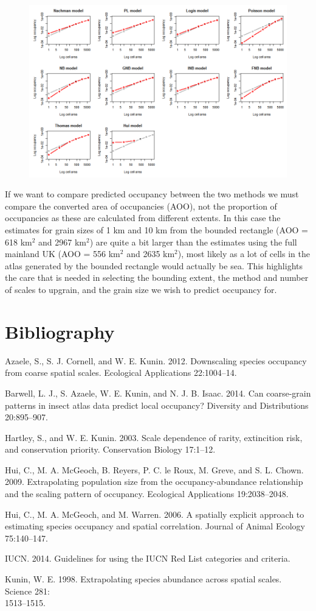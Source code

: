 \documentclass{article}[12pt, a4paper]
\begin{document}
\begin{figure}[!ht]
\centering
\includegraphics[width=\linewidth]{Downscaling-downscale42}
\end{figure}

If we want to compare predicted occupancy between the two methods we must compare the converted area of occupancies (AOO), not the proportion of occupancies as these are calculated from different extents. In this case the estimates for grain sizes of 1 km and 10 km from the bounded rectangle (AOO = 618 km$^2$ and 2967 km$^2$) are quite a bit larger than the estimates using the full mainland UK (AOO = 556 km$^2$ and 2635 km$^2$), most likely as a lot of cells in the atlas generated by the bounded rectangle would actually be sea. This highlights the care that is needed in selecting the bounding extent, the method and number of scales to upgrain, and the grain size we wish to predict occupancy for.

\section{Bibliography}

Azaele, S., S. J. Cornell, and W. E. Kunin. 2012. Downscaling species occupancy from coarse spatial scales. Ecological Applications 22:1004–14.

Barwell, L. J., S. Azaele, W. E. Kunin, and N. J. B. Isaac. 2014. Can coarse-grain patterns in insect atlas data predict local occupancy? Diversity and Distributions 20:895–907.

Hartley, S., and W. E. Kunin. 2003. Scale dependence of rarity, extincition risk, and conservation priority. Conservation Biology 17:1–12.

Hui, C., M. A. McGeoch, B. Reyers, P. C. le Roux, M. Greve, and S. L. Chown. 2009. Extrapolating population size from the occupancy-abundance relationship and the scaling pattern of occupancy. Ecological Applications 19:2038–2048.

Hui, C., M. A. McGeoch, and M. Warren. 2006. A spatially explicit approach to estimating species occupancy and spatial correlation. Journal of Animal Ecology 75:140–147.

IUCN. 2014. Guidelines for using the IUCN Red List categories and criteria.

Kunin, W. E. 1998. Extrapolating species abundance across spatial scales. Science 281:\\
1513–1515.
\end{document}
